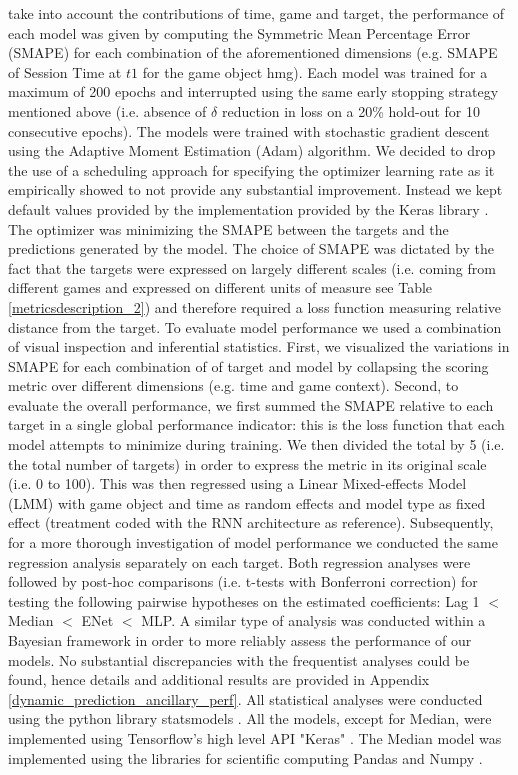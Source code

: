 take into account the contributions of time, game and target, the performance of each model was given by computing the Symmetric Mean Percentage Error (SMAPE) \cite{zhu2017deep} for each combination of the aforementioned dimensions (e.g. SMAPE of Session Time at $t1$ for the game object hmg). Each model was trained for a maximum of 200 epochs and interrupted using the same early stopping strategy mentioned above (i.e. absence of $\delta$ reduction in loss on a 20\% hold-out for 10 consecutive epochs). The models were trained with stochastic gradient descent using the Adaptive Moment Estimation (Adam) \cite{kingma2014adam} algorithm. We decided to drop the use of a scheduling approach for specifying the optimizer learning rate as it empirically showed to not provide any substantial improvement. Instead we kept default values provided by the implementation provided by the Keras library \cite{chollet2015keras}. The optimizer was minimizing the SMAPE between the targets and the predictions generated by the model. The choice of SMAPE was dictated by the fact that the targets were expressed on largely different scales (i.e. coming from different games and expressed on different units of measure see Table \ref{metricsdescription_2}) and therefore required a loss function measuring relative distance from the target. To evaluate model performance we used a combination of visual inspection and inferential statistics. First, we visualized the variations in SMAPE for each combination of of target and model by collapsing the scoring metric over different dimensions (e.g. time and game context). Second, to evaluate the overall performance, we first summed the SMAPE relative to each target in a single global performance indicator: this is the loss function that each model attempts to minimize during training. We then divided the total by 5 (i.e. the total number of targets) in order to express the metric in its original scale (i.e. 0 to 100). This was then regressed using a Linear Mixed-effects Model (LMM) with game object and time as random effects and model type as fixed effect (treatment coded with the RNN architecture as reference). Subsequently, for a more thorough investigation of model performance we conducted the same regression analysis separately on each target. Both regression analyses were followed by post-hoc comparisons (i.e. t-tests with Bonferroni correction) for testing the following pairwise hypotheses on the estimated coefficients: Lag 1 $<$ Median $<$ ENet $<$ MLP. A similar type of analysis was conducted within a Bayesian framework in order to more reliably assess the performance of our models. No substantial discrepancies with the frequentist analyses could be found, hence details and additional results are provided in Appendix \ref{dynamic_prediction_ancillary_perf}. All statistical analyses were conducted using the python library statsmodels \cite{seabold2010statsmodels}.  All the models, except for Median, were implemented using Tensorflow's high level API "Keras" \cite{tensorflow2015-whitepaper,chollet2015keras}. The Median model was implemented using the libraries for scientific computing Pandas and Numpy \cite{reback2020pandas,harris2020array}.

